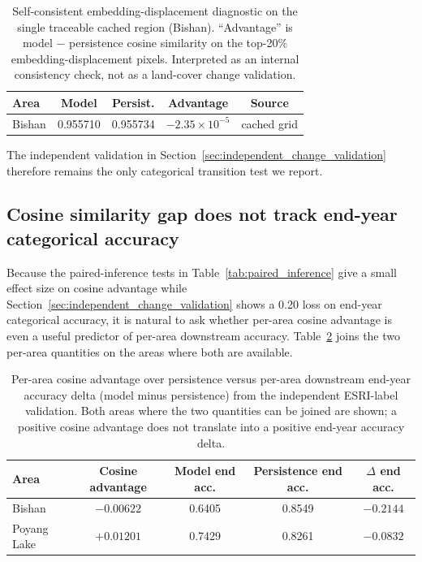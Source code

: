 \documentclass{article}
\begin{document}
\begin{table}[htbp]
\centering
\caption{Self-consistent embedding-displacement diagnostic on the single traceable cached region (Bishan). ``Advantage'' is model $-$ persistence cosine similarity on the top-20\% embedding-displacement pixels. Interpreted as an internal consistency check, not as a land-cover change validation.}
\label{tab:changepixel}
\begin{tabular}{lcccc}
\toprule
Area & Model & Persist. & Advantage & Source \\
\midrule
Bishan & 0.955710 & 0.955734 & $-2.35 \times 10^{-5}$ & cached grid \\
\bottomrule
\end{tabular}
\end{table}

The independent validation in Section~\ref{sec:independent_change_validation} therefore remains the only categorical transition test we report.

\subsection{Cosine similarity gap does not track end-year categorical accuracy}
\label{sec:cosine_to_accuracy}

Because the paired-inference tests in Table~\ref{tab:paired_inference} give a small effect size on cosine advantage while Section~\ref{sec:independent_change_validation} shows a 0.20 loss on end-year categorical accuracy, it is natural to ask whether per-area cosine advantage is even a useful predictor of per-area downstream accuracy. Table~\ref{tab:cosine_to_accuracy} joins the two per-area quantities on the areas where both are available.

\begin{table}[htbp]
\centering
\caption{Per-area cosine advantage over persistence versus per-area downstream end-year accuracy delta (model minus persistence) from the independent ESRI-label validation. Both areas where the two quantities can be joined are shown; a positive cosine advantage does not translate into a positive end-year accuracy delta.}
\label{tab:cosine_to_accuracy}
\small
\begin{tabular*}{\textwidth}{@{\extracolsep{\fill}}lcccc@{}}
\toprule
Area & Cosine advantage & Model end acc. & Persistence end acc. & $\Delta$ end acc. \\
\midrule
Bishan       & $-0.00622$ & 0.6405 & 0.8549 & $-0.2144$ \\
Poyang Lake  & $+0.01201$ & 0.7429 & 0.8261 & $-0.0832$ \\
\bottomrule
\end{tabular*}
\end{table}
\end{document}
